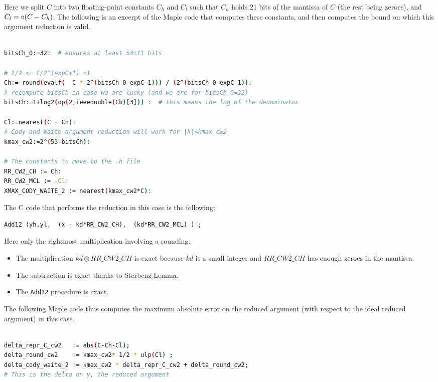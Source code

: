 Here we split $C$ into two floating-point constants $C_h$ and $C_l$
such that $C_h$ holds 21 bits of the mantissa of $C$ (the rest being
zeroes), and $C_l=\circ(C-C_h)$.  The following is an excerpt of the
Maple code that computes these constants, and then computes the
bound on which this argument reduction is valid.

\begin{lstlisting}[caption={Maple script for computing constants for Cody and Waite 2},
  firstnumber=1,  language={sh}, numbers=none]% of course it's maple
%Skip a line here, I don't know why, otherwise latex eats the first line

bitsCh_0:=32:  # ensures at least 53+11 bits

# 1/2 <= C/2^(expC+1) <1
Ch:= round(evalf(  C * 2^(bitsCh_0-expC-1))) / (2^(bitsCh_0-expC-1)):
# recompute bitsCh in case we are lucky (and we are for bitsCh_0=32)
bitsCh:=1+log2(op(2,ieeedouble(Ch)[3])) :  # this means the log of the denominator

Cl:=nearest(C - Ch):
# Cody and Waite argument reduction will work for |k|<kmax_cw2
kmax_cw2:=2^(53-bitsCh):

# The constants to move to the .h file
RR_CW2_CH := Ch:
RR_CW2_MCL := -Cl:
XMAX_CODY_WAITE_2 := nearest(kmax_cw2*C):
\end{lstlisting}

The C code that performs the reduction in this case is the following:

\begin{lstlisting}[caption={Cody and Waite argument reduction with two
    constants},firstnumber=31]
	Add12 (yh,yl,  (x - kd*RR_CW2_CH),  (kd*RR_CW2_MCL) ) ;
\end{lstlisting}

Here only the rightmost multiplication involving a rounding: 
\begin{itemize}
\item The multiplication $\mathit{kd}\otimes \mathit{RR\_CW2\_CH}$ is
  exact because $kd$ is a small integer and $\mathit{RR\_CW2\_CH}$
  has enough zeroes in the mantissa.
\item The subtraction is exact thanks to Sterbenz Lemma.
\item The \texttt{Add12} procedure is exact.
\end{itemize}

The following Maple code thus computes the maximum absolute error on
the reduced argument (with respect to the ideal reduced argument) in
this case.
\begin{lstlisting}[caption={Maple script for computing absolute error for Cody and Waite 2},
  firstnumber=1,  language={sh}, numbers=none]% of course it's maple

delta_repr_C_cw2   := abs(C-Ch-Cl);
delta_round_cw2    := kmax_cw2* 1/2 * ulp(Cl) ;
delta_cody_waite_2 := kmax_cw2 * delta_repr_C_cw2 + delta_round_cw2;
# This is the delta on y, the reduced argument
\end{lstlisting}


